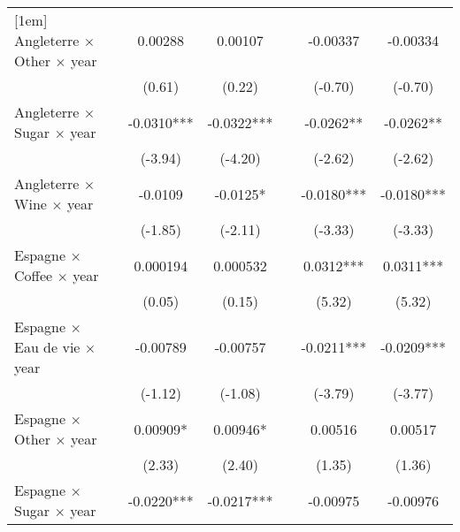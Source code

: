 {\begin{tabular}{l*{6}{c}}
[1em]
Angleterre $\times$ Other $\times$ year&                     &     0.00288         &     0.00107         &                     &    -0.00337         &    -0.00334         \\
                    &                     &      (0.61)         &      (0.22)         &                     &     (-0.70)         &     (-0.70)         \\
[1em]
Angleterre $\times$ Sugar $\times$ year&                     &     -0.0310***&     -0.0322***&                     &     -0.0262** &     -0.0262** \\
                    &                     &     (-3.94)         &     (-4.20)         &                     &     (-2.62)         &     (-2.62)         \\
[1em]
Angleterre $\times$ Wine $\times$ year&                     &     -0.0109         &     -0.0125*  &                     &     -0.0180***&     -0.0180***\\
                    &                     &     (-1.85)         &     (-2.11)         &                     &     (-3.33)         &     (-3.33)         \\
[1em]
Espagne $\times$ Coffee $\times$ year&                     &    0.000194         &    0.000532         &                     &      0.0312***&      0.0311***\\
                    &                     &      (0.05)         &      (0.15)         &                     &      (5.32)         &      (5.32)         \\
[1em]
Espagne $\times$ Eau de vie $\times$ year&                     &    -0.00789         &    -0.00757         &                     &     -0.0211***&     -0.0209***\\
                    &                     &     (-1.12)         &     (-1.08)         &                     &     (-3.79)         &     (-3.77)         \\
[1em]
Espagne $\times$ Other $\times$ year&                     &     0.00909*  &     0.00946*  &                     &     0.00516         &     0.00517         \\
                    &                     &      (2.33)         &      (2.40)         &                     &      (1.35)         &      (1.36)         \\
[1em]
Espagne $\times$ Sugar $\times$ year&                     &     -0.0220***&     -0.0217***&                     &    -0.00975         &    -0.00976         \\

\end{tabular}}
